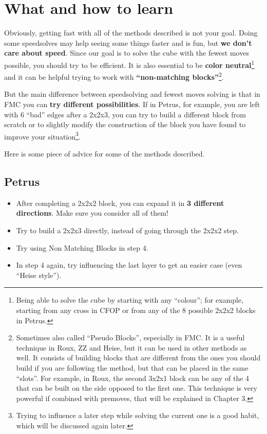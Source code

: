 \documentclass[11pt,a4paper]{book}
\begin{document}
\section{What and how to learn}
Obviously, getting fast with all of the methods described is not your goal. Doing some speedsolves may help seeing some things faster and is fun, but \textbf{we don't care about speed}. Since our goal is to solve the cube with the fewest moves possible, you should try to be efficient. It is also essential to be \textbf{color neutral}\footnote{Being able to solve the cube by starting with any ``colour''; for example, starting from any cross in CFOP or from any of the 8 possible 2x2x2 blocks in Petrus.} and it can be helpful trying to work with \textbf{``non-matching blocks''}\footnote{Sometimes also called ``Pseudo Blocks'', especially in FMC. It is a useful technique in Roux, ZZ and Heise, but it can be used in other methods as well. It consists of building blocks that are different from the ones you should build if you are following the method, but that can be placed in the same ``slots''. For example, in Roux, the second 3x2x1 block can be any of the 4 that can be built on the side opposed to the first one. This technique is very powerful if combined with premoves, that will be explained in Chapter 3.}.

But the main difference between speedsolving and fewest moves solving is that in FMC you can \textbf{try different possibilities}. If in Petrus, for example, you are left with 6 ``bad'' edges after a 2x2x3, you can try to build a different block from scratch or to slightly modify the construction of the block you have found to improve your situation\footnote{Trying to influence a later step while solving the current one is a good habit, which will be discussed again later.}.

Here is some piece of advice for some of the methods described.

\subsection{Petrus}
\begin{itemize}
\item After completing a 2x2x2 block, you can expand it in \textbf{3 different directions}. Make sure you consider all of them!
\item Try to build a 2x2x3 directly, instead of going through the 2x2x2 step.
\item Try using Non Matching Blocks in step 4.
\item In step 4 again, try influencing the last layer to get an easier case (even ``Heise style'').
\end{itemize}
\end{document}
